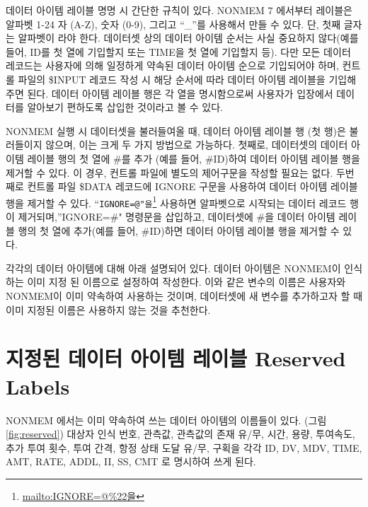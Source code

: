 \documentclass[
  10pt,
]{krantz}
\renewcommand{\href}[2]{#2\footnote{\url{#1}}}
\begin{document}
데이터 아이템 레이블 명명 시 간단한 규칙이 있다. NONMEM 7 에서부터 레이블은 알파벳 1-24 자 (A-Z), 숫자 (0-9), 그리고 ``\_''를 사용해서 만들 수 있다. 단, 첫째 글자는 알파벳이 라야 한다. 데이터셋 상의 데이터 아이템 순서는 사실 중요하지 않다(예를 들어, ID를 첫 열에 기입할지 또는 TIME을 첫 열에 기입할지 등). 다만 모든 데이터 레코드는 사용자에 의해 일정하게 약속된 데이터 아이템 순으로 기입되어야 하며, 컨트롤 파일의 \$INPUT 레코드 작성 시 해당 순서에 따라 데이터 아이템 레이블을 기입해주면 된다. 데이터 아이템 레이블 행은 각 열을 명시함으로써 사용자가 입장에서 데이터를 알아보기 편하도록 삽입한 것이라고 볼 수 있다.

NONMEM 실행 시 데이터셋을 불러들여올 때, 데이터 아이템 레이블 행 (첫 행)은 불러들이지 않으며, 이는 크게 두 가지 방법으로 가능하다. 첫째로, 데이터셋의 데이터 아이템 레이블 행의 첫 열에 \#를 추가 (예를 들어, \#ID)하여 데이터 아이템 레이블 행을 제거할 수 있다. 이 경우, 컨트롤 파일에 별도의 제어구문을 작성할 필요는 없다. 두번째로 컨트롤 파일 \$DATA 레코드에 IGNORE 구문을 사용하여 데이터 아이템 레이블 행을 제거할 수 있다. ``\href{mailto:IGNORE=@\%22을}{\nolinkurl{IGNORE=@"을}} 사용하면 알파벳으로 시작되는 데이터 레코드 행이 제거되며,''IGNORE=\#" 명령문을 삽입하고, 데이터셋에 \#을 데이터 아이템 레이블 행의 첫 열에 추가(예를 들어, \#ID)하면 데이터 아이템 레이블 행을 제거할 수 있다.

각각의 데이터 아이템에 대해 아래 설명되어 있다. 데이터 아이템은 NONMEM이 인식하는 이미 지정 된 이름으로 설정하여 작성한다. 이와 같은 변수의 이름은 사용자와 NONMEM이 이미 약속하여 사용하는 것이며, 데이터셋에 새 변수를 추가하고자 할 때 이미 지정된 이름은 사용하지 않는 것을 추천한다.

\hypertarget{uxc9c0uxc815uxb41c-uxb370uxc774uxd130-uxc544uxc774uxd15c-uxb808uxc774uxbe14-reserved-labels}{%
\section{지정된 데이터 아이템 레이블 Reserved Labels}\label{uxc9c0uxc815uxb41c-uxb370uxc774uxd130-uxc544uxc774uxd15c-uxb808uxc774uxbe14-reserved-labels}}

NONMEM 에서는 이미 약속하여 쓰는 데이터 아이템의 이름들이 있다. (그림 \ref{fig:reserved}) 대상자 인식 번호, 관측값, 관측값의 존재 유/무, 시간, 용량, 투여속도, 추가 투여 횟수, 투여 간격, 항정 상태 도달 유/무, 구획을 각각 ID, DV, MDV, TIME, AMT, RATE, ADDL, II, SS, CMT 로 명시하여 쓰게 된다.
\end{document}
